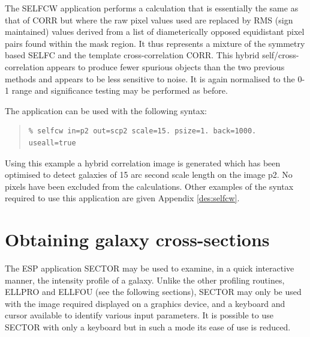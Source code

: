 \documentclass[twoside,11pt]{article}
\newcommand{\xlabel}[1]{}
\newenvironment{myquote}{\begin{quote}\begin{small}}{\end{small}\end{quote}}
\begin{document}
The SELFCW application performs a calculation that is essentially the same 
as that of CORR but where the raw pixel values used are replaced by RMS 
(sign maintained) values derived from a list of diameterically opposed 
equidistant pixel pairs found within the mask region. It thus 
represents a mixture of the symmetry based SELFC and the template 
cross-correlation CORR. This hybrid self/cross-correlation appears 
to produce fewer spurious objects than the two previous methods and 
appears to be less sensitive to noise. It is again normalised to the 
0-1 range and significance testing may be performed as
before.

The application can be used with the following syntax:

\begin{myquote}
\begin{verbatim}
% selfcw in=p2 out=scp2 scale=15. psize=1. back=1000. useall=true
\end{verbatim}
\end{myquote}

Using this example a hybrid correlation image is generated which has been 
optimised to detect galaxies of 15 arc second scale length on the 
image p2. No pixels have been excluded from the calculations. 
Other examples of the syntax required to use this application are given
Appendix \ref{des:selfcw}.


\section{Obtaining galaxy cross-sections}
\xlabel{SECTOR}
\label{sec:obtaining}

The ESP application SECTOR may be used to examine, in a quick 
interactive manner, the intensity profile of a galaxy. Unlike the 
other profiling routines, ELLPRO and ELLFOU (see the following sections), 
SECTOR may only be used with the image required displayed on a graphics 
device, and a keyboard and cursor available to identify various input 
parameters. It is possible to use SECTOR with only a keyboard but in 
such a mode its ease of use is reduced.
\end{document}
